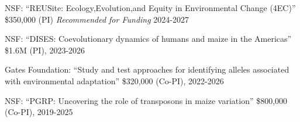 \documentclass[letterpaper,10pt]{article}
\renewenvironment{itemize}{
  \begin{list}{}{
    \setlength{\leftmargin}{1.5em}
  }
}{
  \end{list}
}
\begin{document}
\begin{itemize}
\item NSF: ``REUSite: Ecology,Evolution,and Equity in Environmental Change (4EC)'' \$350,000 (PI) \textit{Recommended for Funding} 2024-2027
\item NSF: ``DISES: Coevolutionary dynamics of humans and maize in the Americas'' \$1.6M (PI), 2023-2026
\item Gates Foundation: ``Study and test approaches for identifying alleles associated with environmental adaptation'' \$320,000 (Co-PI), 2022-2026
\item NSF: ``PGRP: Uncovering the role of transposons in maize variation'' \$800,000  (Co-PI), 2019-2025%

\end{itemize}
\end{document}
